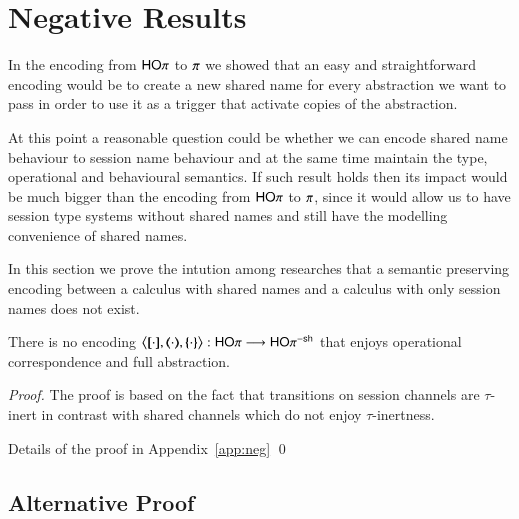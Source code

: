 \section{Negative Results}\label{s:negative}

In the encoding from $\mathsf{HO}\pi$ to $\pi$ we showed that
an easy and straightforward encoding would be to create
a new shared name for every abstraction we want to pass
in order to use it as a trigger that activate copies of
the abstraction.

At this point a reasonable question could be whether we can
encode shared name behaviour to session name behaviour and at
the same time maintain the type, operational and behavioural semantics.
If such result holds then its impact would be much bigger than
the encoding from $\mathsf{HO}\pi$ to $\pi$, since it would
allow us to have session type systems without shared names
and still have the modelling convenience of shared names.

In this section we prove the intution among researches 
that a semantic preserving encoding between a calculus
with shared names and a calculus with only session names
does not exist.

\begin{theorem}\rm
	There is no encoding $\enco{\map{\cdot}, \mapt{\cdot}, \mapa{\cdot}}: \HOp \longrightarrow \HOp^{\minussh}$
	that enjoys operational correspondence and full abstraction.
\end{theorem}

\begin{proof}
	The proof is based on the fact that
	transitions on session channels are
	$\tau$-inert in contrast with shared
	channels which do not enjoy
	$\tau$-inertness.

	Details of the proof in Appendix~\ref{app:neg}
	\qed
\end{proof}

\subsection{Alternative Proof}



%
%

